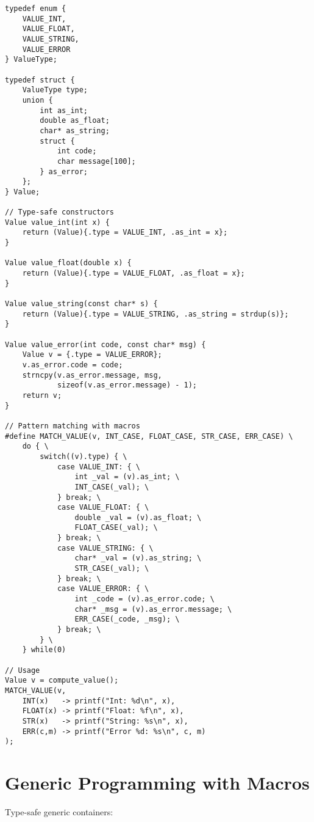 \begin{lstlisting}
typedef enum {
    VALUE_INT,
    VALUE_FLOAT,
    VALUE_STRING,
    VALUE_ERROR
} ValueType;

typedef struct {
    ValueType type;
    union {
        int as_int;
        double as_float;
        char* as_string;
        struct {
            int code;
            char message[100];
        } as_error;
    };
} Value;

// Type-safe constructors
Value value_int(int x) {
    return (Value){.type = VALUE_INT, .as_int = x};
}

Value value_float(double x) {
    return (Value){.type = VALUE_FLOAT, .as_float = x};
}

Value value_string(const char* s) {
    return (Value){.type = VALUE_STRING, .as_string = strdup(s)};
}

Value value_error(int code, const char* msg) {
    Value v = {.type = VALUE_ERROR};
    v.as_error.code = code;
    strncpy(v.as_error.message, msg,
            sizeof(v.as_error.message) - 1);
    return v;
}

// Pattern matching with macros
#define MATCH_VALUE(v, INT_CASE, FLOAT_CASE, STR_CASE, ERR_CASE) \
    do { \
        switch((v).type) { \
            case VALUE_INT: { \
                int _val = (v).as_int; \
                INT_CASE(_val); \
            } break; \
            case VALUE_FLOAT: { \
                double _val = (v).as_float; \
                FLOAT_CASE(_val); \
            } break; \
            case VALUE_STRING: { \
                char* _val = (v).as_string; \
                STR_CASE(_val); \
            } break; \
            case VALUE_ERROR: { \
                int _code = (v).as_error.code; \
                char* _msg = (v).as_error.message; \
                ERR_CASE(_code, _msg); \
            } break; \
        } \
    } while(0)

// Usage
Value v = compute_value();
MATCH_VALUE(v,
    INT(x)   -> printf("Int: %d\n", x),
    FLOAT(x) -> printf("Float: %f\n", x),
    STR(x)   -> printf("String: %s\n", x),
    ERR(c,m) -> printf("Error %d: %s\n", c, m)
);
\end{lstlisting}

\section{Generic Programming with Macros}

Type-safe generic containers:

